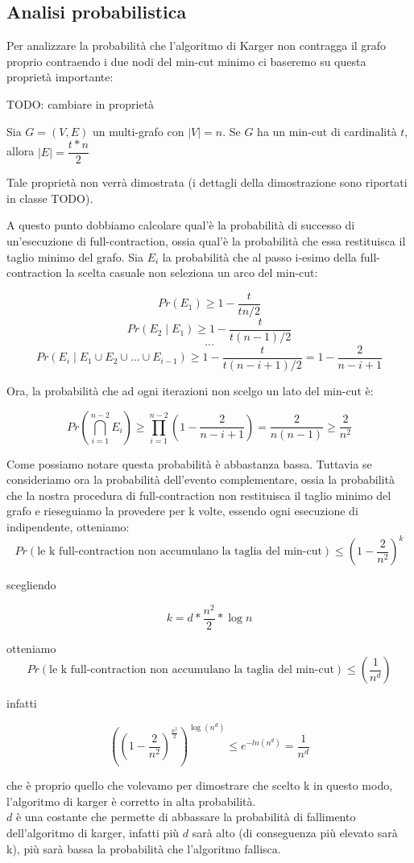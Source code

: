 \subsection{Analisi probabilistica}
\label{sub:karger-success-probability}

Per analizzare la probabilità che l'algoritmo di Karger non contragga il grafo proprio contraendo i due nodi del min-cut minimo ci baseremo su questa proprietà importante:

TODO: cambiare in proprietà
\begin{defn}
Sia $ G = (V, E) $ un multi-grafo con $ \lvert V \rvert = n$. Se $G$ ha un min-cut di cardinalità $t$, allora $\lvert E \rvert = \dfrac{t * n}{2}$
\end{defn}

Tale proprietà non verrà dimostrata (i dettagli della dimostrazione sono riportati in classe TODO).

A questo punto dobbiamo calcolare qual'è la probabilità di successo di un'esecuzione di full-contraction, ossia qual'è la probabilità che essa restituisca il taglio minimo del grafo.
Sia $E_{i}$ la probabilità che al passo i-esimo della full-contraction la scelta casuale non seleziona un arco del min-cut:

$$Pr(E_{1}) \geq 1-\dfrac{t}{t n/2}$$
$$Pr(E_{2} \mid E_{1}) \geq 1-\dfrac{t}{t (n-1)/2}$$
$$...$$
$$Pr(E_{i} \mid E_{1} \cup E_{2} \cup ... \cup E_{i-1}) \geq 1-\dfrac{t}{t (n-i+1)/2} = 1 - \dfrac{2}{n-i+1}$$

Ora, la probabilità che ad ogni iterazioni non scelgo un lato del min-cut è:

$$Pr(\bigcap_{i=1}^{n-2} E_{i}) \geq \prod_{i=1}^{n-2} (1 - \dfrac{2}{n-i+1}) = \dfrac{2}{n(n-1)} \geq \dfrac{2}{n^2}$$

\noindent Come possiamo notare questa probabilità è abbastanza bassa. Tuttavia se consideriamo ora la probabilità dell'evento complementare, ossia la probabilità che la nostra procedura di full-contraction non restituisca il taglio minimo del grafo e rieseguiamo la provedere per k volte, essendo ogni esecuzione di indipendente, otteniamo:
$$ Pr(\text{le k full-contraction non accumulano la taglia del min-cut}) \leq (1- \dfrac{2}{n^2})^k $$

\noindent scegliendo

$$ k = d * \dfrac{n^2}{2} * \log{n} $$

\noindent otteniamo
$$ Pr(\text{le k full-contraction non accumulano la taglia del min-cut}) \leq (\dfrac{1}{n^d}) $$

\noindent infatti

$$((1-\frac{2}{n^2})^{\frac{n^2}{2}} )^{\log{(n^d)}} \leq e^{-ln(n^d)} = \dfrac{1}{n^d}$$

\noindent che è proprio quello che volevamo per dimostrare che scelto k in questo modo, l'algoritmo di karger è corretto in alta probabilità.\\

\noindent $d$ è una costante che permette di abbassare la probabilità di fallimento dell'algoritmo di karger, infatti più $d$ sarà alto (di conseguenza più elevato sarà k), più sarà bassa la probabilità che l'algoritmo fallisca.


